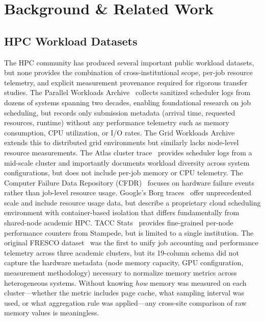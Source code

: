 \documentclass[sigconf]{acmart}
\begin{document}
\section{Background \& Related Work}

\subsection{HPC Workload Datasets}

The HPC community has produced several important public workload datasets, but none provides the combination of cross-institutional scope, per-job resource telemetry, and explicit measurement provenance required for rigorous transfer studies.
The Parallel Workloads Archive~\cite{feitelson2014experience} collects sanitized scheduler logs from dozens of systems spanning two decades, enabling foundational research on job scheduling, but records only submission metadata (arrival time, requested resources, runtime) without any performance telemetry such as memory consumption, CPU utilization, or I/O rates.
The Grid Workloads Archive~\cite{iosup2008grid} extends this to distributed grid environments but similarly lacks node-level resource measurements.
The Atlas cluster trace~\cite{atlas2020} provides scheduler logs from a mid-scale cluster and importantly documents workload diversity across system configurations, but does not include per-job memory or CPU telemetry.
The Computer Failure Data Repository (CFDR)~\cite{cfdr2010} focuses on hardware failure events rather than job-level resource usage.
Google's Borg traces~\cite{google_borg_2015} offer unprecedented scale and include resource usage data, but describe a proprietary cloud scheduling environment with container-based isolation that differs fundamentally from shared-node academic HPC.
TACC Stats~\cite{tacc_stats_2014} provides fine-grained per-node performance counters from Stampede, but is limited to a single institution.
The original FRESCO dataset~\cite{mckerracher2025fresco} was the first to unify job accounting and performance telemetry across three academic clusters, but its 19-column schema did not capture the hardware metadata (node memory capacity, GPU configuration, measurement methodology) necessary to normalize memory metrics across heterogeneous systems.
Without knowing \emph{how} memory was measured on each cluster---whether the metric includes page cache, what sampling interval was used, or what aggregation rule was applied---any cross-site comparison of raw memory values is meaningless.
\end{document}
